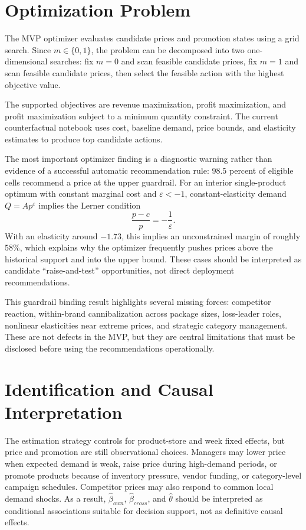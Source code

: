 \documentclass[11pt]{article}
\begin{document}
\section{Optimization Problem}

The MVP optimizer evaluates candidate prices and promotion states using a grid search. Since $m\in\{0,1\}$, the problem can be decomposed into two one-dimensional searches: fix $m=0$ and scan feasible candidate prices, fix $m=1$ and scan feasible candidate prices, then select the feasible action with the highest objective value.

The supported objectives are revenue maximization, profit maximization, and profit maximization subject to a minimum quantity constraint. The current counterfactual notebook uses cost, baseline demand, price bounds, and elasticity estimates to produce top candidate actions.

The most important optimizer finding is a diagnostic warning rather than evidence of a successful automatic recommendation rule: 98.5 percent of eligible cells recommend a price at the upper guardrail. For an interior single-product optimum with constant marginal cost and $\varepsilon<-1$, constant-elasticity demand $Q=A p^{\varepsilon}$ implies the Lerner condition
\begin{equation}
\frac{p-c}{p}=-\frac{1}{\varepsilon}.
\end{equation}
With an elasticity around $-1.73$, this implies an unconstrained margin of roughly $58\%$, which explains why the optimizer frequently pushes prices above the historical support and into the upper bound. These cases should be interpreted as candidate ``raise-and-test'' opportunities, not direct deployment recommendations.

This guardrail binding result highlights several missing forces: competitor reaction, within-brand cannibalization across package sizes, loss-leader roles, nonlinear elasticities near extreme prices, and strategic category management. These are not defects in the MVP, but they are central limitations that must be disclosed before using the recommendations operationally.

\section{Identification and Causal Interpretation}

The estimation strategy controls for product-store and week fixed effects, but price and promotion are still observational choices. Managers may lower price when expected demand is weak, raise price during high-demand periods, or promote products because of inventory pressure, vendor funding, or category-level campaign schedules. Competitor prices may also respond to common local demand shocks. As a result, $\widehat{\beta}_{own}$, $\widehat{\beta}_{cross}$, and $\widehat{\theta}$ should be interpreted as conditional associations suitable for decision support, not as definitive causal effects.
\end{document}

